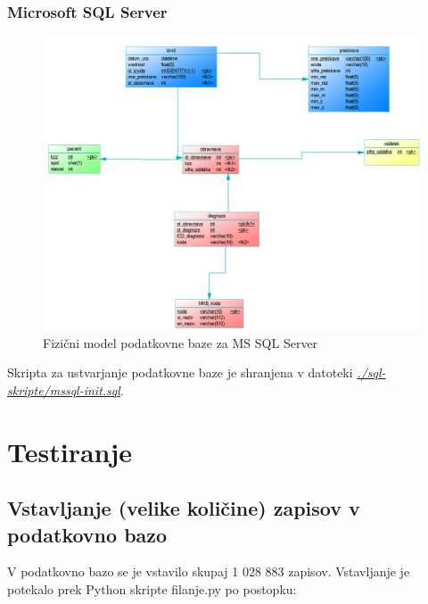 \documentclass[a4paper,11pt]{report}
\begin{document}
\pagebreak
\subsection{Microsoft SQL Server}
\begin{figure}[htb]
   \noindent\includegraphics[width=\linewidth]{./pics/fizicni-mssql.png}
   \caption{Fizični model podatkovne baze za MS SQL Server}
\end{figure}
Skripta za ustvarjanje podatkovne baze je shranjena v datoteki \textit{\underline{./sql-skripte/mssql-init.sql}}.

\chapter{Testiranje}

\section{Vstavljanje (velike količine) zapisov v podatkovno bazo}

V podatkovno bazo se je vstavilo skupaj 1 028 883 zapisov. Vstavljanje je potekalo prek Python skripte filanje.py po postopku: 
\end{document}
